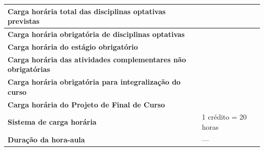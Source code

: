 \begin{table}[h!]
\begin{tabular}{p{6cm}p{10cm}}
			\textbf{Carga horária total das disciplinas optativas previstas} & \CHOPT \\ \hline
			
			\textbf{Carga horária obrigatória de disciplinas optativas} & \CHOPTMIN \\ \hline
			
			\textbf{Carga horária do estágio obrigatório} & \CHESTAGIO \\ \hline
			
			\textbf{Carga horária das atividades complementares não obrigatórias} & \CHCOMP \\ \hline
			
			\textbf{Carga horária obrigatória para integralização do curso} & \CHTOTALOB \\ \hline
			
			\textbf{Carga horária do Projeto de Final de Curso} & \CHPFC \\ \hline
			
			\textbf{Sistema de carga horária} & 1 crédito = 20 horas \\ \hline
			
			\textbf{Duração da hora-aula} & --- \\ \hline
			
		\end{tabular}
	\end{table}
	

